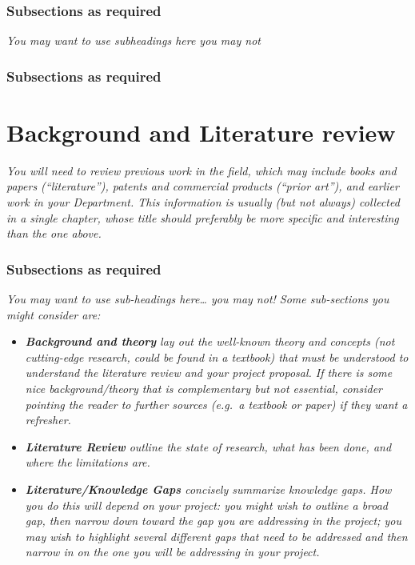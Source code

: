 \documentclass[12pt,openany,a4paper]{book}
\newcommand{\purple}[1]{\textcolor{topicpurple}{\textit{#1}}}
\begin{document}
\subsection{Subsections as required}
\purple{You may want to use subheadings here you may not}

\subsection{Subsections as required}

\chapter{Background and Literature review}

\purple{You will need to review previous work in the field, which may include
books and papers (``literature''), patents and commercial products
(``prior art''), and earlier work in your Department.  This
information is usually (but not always) collected in a single chapter,
whose title should preferably be more specific and interesting than
the one above.}

\subsection{Subsections as required}
\purple{ You may want to use sub-headings here\dots{} you may not!
Some sub-sections you might consider are:}
\begin{itemize}
  \item\purple{\textbf{Background and theory} lay out the well-known theory and concepts (not cutting-edge research, could be found in a textbook) that must be understood to understand the literature review and your project proposal. If there is some nice background/theory that is complementary but not essential, consider pointing the reader to further sources (e.g.\ a textbook or paper) if they want a refresher.}
  \item \purple{\textbf{Literature Review} outline the state of research, what has been done, and where the limitations are.}
  \item \purple{\textbf{Literature/Knowledge Gaps} concisely summarize knowledge gaps. How you do this will depend on your project: you might wish to outline a broad gap, then narrow down toward the gap you are addressing in the project; you may wish to highlight several different gaps that need to be addressed and then narrow in on the one you will be addressing in your project.}
\end{itemize}
\end{document}
